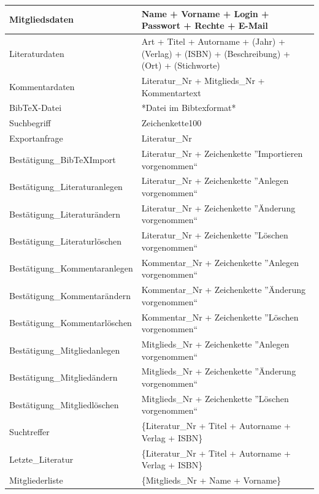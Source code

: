 \begin{longtable}{|l|p{8.5cm}|}
Mitgliedsdaten & Name + Vorname + Login + Passwort + Rechte + E-Mail\\
\hline
Literaturdaten & Art + Titel + Autorname + (Jahr) + (Verlag) + (ISBN) + (Beschreibung) + (Ort) + (Stichworte) \\
\hline
Kommentardaten & Literatur\_Nr + Mitglieds\_Nr + Kommentartext \\
\hline
BibTeX-Datei & *Datei im Bibtexformat* \\
\hline
Suchbegriff & Zeichenkette100 \\
\hline
Exportanfrage & Literatur\_Nr \\
\hline\hline

Bestätigung\_BibTeXImport & Literatur\_Nr + Zeichenkette ''Importieren vorgenommen`` \\
\hline
Bestätigung\_Literaturanlegen & Literatur\_Nr + Zeichenkette ''Anlegen vorgenommen`` \\
\hline
Bestätigung\_Literaturändern & Literatur\_Nr + Zeichenkette ''Änderung vorgenommen`` \\
\hline
Bestätigung\_Literaturlöschen & Literatur\_Nr + Zeichenkette ''Löschen vorgenommen`` \\
\hline
Bestätigung\_Kommentaranlegen & Kommentar\_Nr + Zeichenkette ''Anlegen vorgenommen`` \\
\hline
Bestätigung\_Kommentarändern & Kommentar\_Nr + Zeichenkette ''Änderung vorgenommen`` \\
\hline
Bestätigung\_Kommentarlöschen & Kommentar\_Nr + Zeichenkette ''Löschen vorgenommen`` \\
\hline
Bestätigung\_Mitgliedanlegen & Mitglieds\_Nr + Zeichenkette ''Anlegen vorgenommen`` \\
\hline
Bestätigung\_Mitgliedändern & Mitglieds\_Nr + Zeichenkette ''Änderung vorgenommen`` \\
\hline
Bestätigung\_Mitgliedlöschen & Mitglieds\_Nr + Zeichenkette ''Löschen vorgenommen`` \\
\hline
Suchtreffer & \{Literatur\_Nr + Titel + Autorname + Verlag + ISBN\}\\
\hline
Letzte\_Literatur & \{Literatur\_Nr + Titel + Autorname + Verlag + ISBN\}\\
\hline
Mitgliederliste & \{Mitglieds\_Nr + Name + Vorname\}\\
\hline
\end{longtable}

